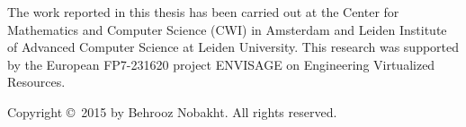 {%
%
\noindent
The work reported in this thesis has been carried out at the Center for Mathematics and Computer Science (CWI) in Amsterdam and Leiden Institute of Advanced Computer Science at Leiden University.
This research was supported by the European FP7-231620 project ENVISAGE on Engineering Virtualized Resources.
\par\vspace {1cm}

%

%
\noindent%
Copyright \copyright\ 2015 by Behrooz Nobakht. All rights reserved. \\ [2ex] %
\\


\clearpage
} %

